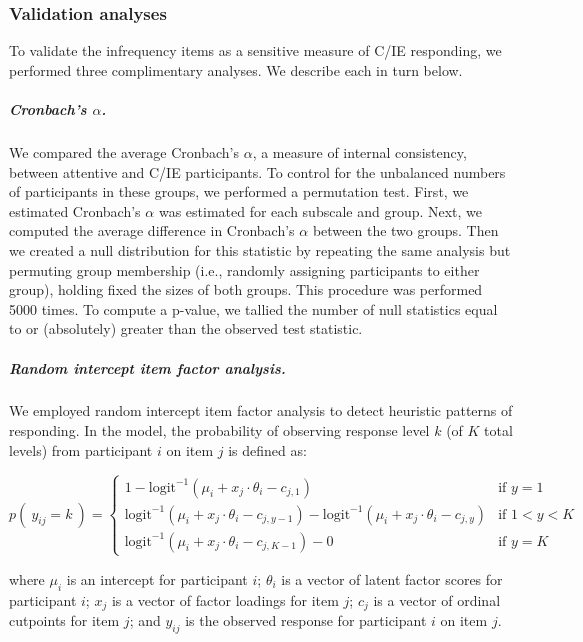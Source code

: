 \documentclass[a4paper,notitlepage,12pt]{article}
\begin{document}
\subsubsection*{Validation analyses}

To validate the infrequency items as a sensitive measure of C/IE responding, we performed three complimentary analyses. We describe each in turn below.

\subparagraph{Cronbach's $\alpha$.} We compared the average Cronbach's $\alpha$, a measure of internal consistency, between attentive and C/IE participants. To control for the unbalanced numbers of participants in these groups, we performed a permutation test. First, we estimated Cronbach's $\alpha$ was estimated for each subscale and group. Next, we computed the average difference in Cronbach's $\alpha$ between the two groups. Then we created a null distribution for this statistic by repeating the same analysis but permuting group membership (i.e., randomly assigning participants to either group), holding fixed the sizes of both groups. This procedure was performed 5000 times. To compute a p-value, we tallied the number of null statistics equal to or (absolutely) greater than the observed test statistic. 

\subparagraph{Random intercept item factor analysis.} We employed random intercept item factor analysis \cite{maydeu2006random} to detect heuristic patterns of responding. In the model, the probability of observing response level $k$ (of $K$ total levels) from participant $i$ on item $j$ is defined as:

\begin{equation*}
    p( \ y_{ij} = k \ ) = \left\{ \begin{array}{ll}
1 - \text{logit}^{-1}( \mu_i + x_j\cdot \theta_i - c_{j,1})  &  \text{if } y = 1 \\[4pt]
\text{logit}^{-1}( \mu_i + x_j\cdot \theta_i - c_{j,y-1}) - \text{logit}^{-1}( \mu_i + x_j\cdot \theta_i - c_{j,y}) & \text{if } 1 < y < K \\[4pt]
\text{logit}^{-1}( \mu_i + x_j\cdot \theta_i - c_{j,K-1}) - 0  &  \text{if } y = K
\end{array} \right.
\end{equation*}

where $\mu_i$ is an intercept for participant $i$; $\theta_i$ is a vector of latent factor scores for participant $i$; $x_j$ is a vector of factor loadings for item $j$; $c_j$ is a vector of ordinal cutpoints for item $j$; and $y_{ij}$ is the observed response for participant $i$ on item $j$.
\end{document}
